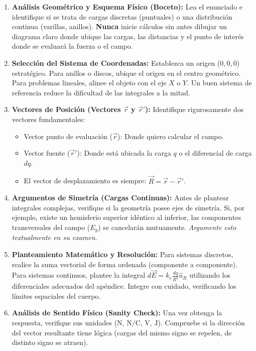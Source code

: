 \documentclass[11pt,letterpaper]{article}
\newcounter{problema}
\begin{document}
\begin{enumerate}
    \item \textbf{Análisis Geométrico y Esquema Físico (Boceto):} 
    Lea el enunciado e identifique si se trata de cargas discretas (puntuales) o una distribución continua (varillas, anillos). \textbf{Nunca} inicie cálculos sin antes dibujar un diagrama claro donde ubique las cargas, las distancias y el punto de interés donde se evaluará la fuerza o el campo.
    
    \item \textbf{Selección del Sistema de Coordenadas:} 
    Establezca un origen ($0,0,0$) estratégico. Para anillos o discos, ubique el origen en el centro geométrico. Para problemas lineales, alinee el objeto con el eje $X$ o $Y$. Un buen sistema de referencia reduce la dificultad de las integrales a la mitad.
    
    \item \textbf{Vectores de Posición (Vectores $\vec{r}$ y $\vec{r}'$):}
    Identifique rigurosamente dos vectores fundamentales:
    \begin{itemize}
        \item Vector punto de evaluación ($\vec{r}$): Donde quiero calcular el campo.
        \item Vector fuente ($\vec{r}'$): Donde está ubicada la carga $q$ o el diferencial de carga $dq$.
        \item El vector de desplazamiento es siempre: $\vec{R} = \vec{r} - \vec{r}'$.
    \end{itemize}
    
    \item \textbf{Argumentos de Simetría (Cargas Continuas):} 
    Antes de plantear integrales complejas, verifique si la geometría posee ejes de simetría. Si, por ejemplo, existe un hemisferio superior idéntico al inferior, las componentes transversales del campo ($E_y$) se cancelarán mutuamente. \textit{Argumente esto textualmente en su examen.}
    
    \item \textbf{Planteamiento Matemático y Resolución:} 
    Para sistemas discretos, realice la suma vectorial de forma ordenada (componente a componente). Para sistemas continuos, plantee la integral $d\vec{E} = k_e \frac{dq}{R^2} \hat{u}_R$ utilizando los diferenciales adecuados del apéndice. Integre con cuidado, verificando los límites espaciales del cuerpo.
    
    \item \textbf{Análisis de Sentido Físico (Sanity Check):} 
    Una vez obtenga la respuesta, verifique sus unidades ($\text{N}$, $\text{N/C}$, $\text{V}$, $\text{J}$). Compruebe si la dirección del vector resultante tiene lógica (cargas del mismo signo se repelen, de distinto signo se atraen).
\end{enumerate}
\end{document}
